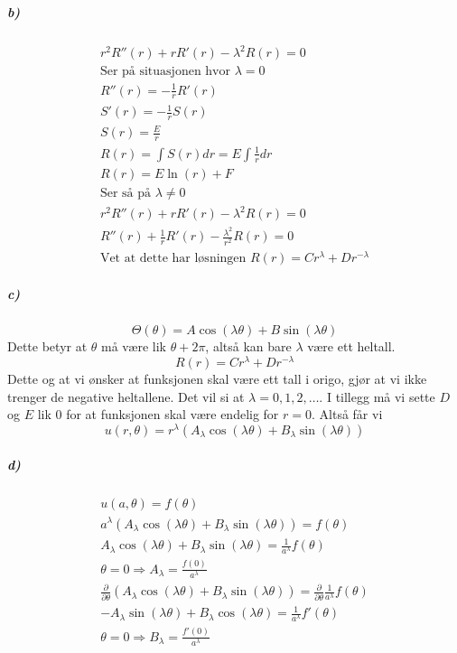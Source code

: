 \documentclass[11pt, A4paper,norsk]{article}
\begin{document}
			\subparagraph{b)}
				\begin{gather*}
r^2 R''(r) + r R'(r) - \lambda^2 R(r) = 0 \\
\text{Ser på situasjonen hvor $\lambda = 0$} \\
R''(r) = - \frac{1}{r} R'(r) \\
S'(r) = - \frac{1}{r} S(r) \\
S(r) = \frac{E}{r} \\
R(r) = \int S(r) dr = E \int \frac{1}{r} dr \\
R(r) = E \ln(r) + F \\
\text{Ser så på $\lambda \neq 0$} \\
r^2 R''(r) + r R'(r) - \lambda^2 R(r) = 0 \\
R''(r) + \frac{1}{r} R'(r) - \frac{\lambda^2}{r^2} R(r) = 0 \\
\text{Vet at dette har løsningen $R(r) = Cr^{\lambda} + Dr^{- \lambda}$}
				\end{gather*}










			\subparagraph{c)}
				\begin{flushleft}
$$\Theta(\theta) = A \cos(\lambda \theta) + B \sin(\lambda \theta)$$
Dette betyr at $\theta$ må være lik $\theta + 2 \pi$, altså kan bare $\lambda$ være ett heltall.
$$R(r) = Cr^{\lambda} + Dr^{- \lambda}$$
Dette og at vi ønsker at funksjonen skal være ett tall i origo, gjør at vi ikke trenger de negative heltallene. Det vil si at $\lambda = 0, 1, 2, \dots$. I tillegg må vi sette $D$ og $E$ lik $0$ for at funksjonen skal være endelig for $r = 0$.
Altså får vi
$$u(r, \theta) = r^{\lambda} \left( A_{\lambda} \cos(\lambda \theta) + B_{\lambda} \sin(\lambda \theta) \right)$$
				\end{flushleft}










			\subparagraph{d)}
				\begin{gather*}
u(a, \theta) = f(\theta) \\
a^{\lambda} \left( A_{\lambda} \cos(\lambda \theta) + B_{\lambda} \sin(\lambda \theta) \right) = f(\theta) \\
A_{\lambda} \cos(\lambda \theta) + B_{\lambda} \sin(\lambda \theta) = \frac{1}{a^{\lambda}} f(\theta) \\
\theta = 0 \Rightarrow A_{\lambda} = \frac{f(0)}{a^{\lambda}} \\
\frac{\partial}{\partial \theta} \left( A_{\lambda} \cos(\lambda \theta) + B_{\lambda} \sin(\lambda \theta) \right) = \frac{\partial}{\partial \theta} \frac{1}{a^{\lambda}} f(\theta) \\
- A_{\lambda} \sin(\lambda \theta) + B_{\lambda} \cos(\lambda \theta) = \frac{1}{a^{\lambda}} f'(\theta) \\
\theta = 0 \Rightarrow B_{\lambda} = \frac{f'(0)}{a^{\lambda}} \\
				\end{gather*}
\end{document}

